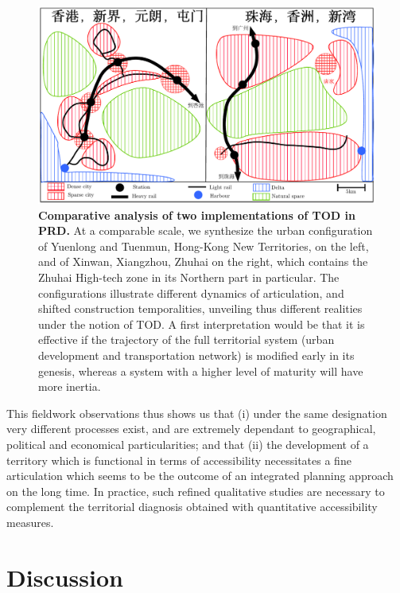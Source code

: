 \begin{figure}
	\includegraphics[width=\linewidth]{figures/tod.pdf}
	\caption{\textbf{Comparative analysis of two implementations of TOD in PRD.} At a comparable scale, we synthesize the urban configuration of Yuenlong and Tuenmun, Hong-Kong New Territories, on the left, and of Xinwan, Xiangzhou, Zhuhai on the right, which contains the Zhuhai High-tech zone in its Northern part in particular. The configurations illustrate different dynamics of articulation, and shifted construction temporalities, unveiling thus different realities under the notion of TOD. A first interpretation would be that it is effective if the trajectory of the full territorial system (urban development and transportation network) is modified early in its genesis, whereas a system with a higher level of maturity will have more inertia.\label{fig:qualitative:schema}}
\end{figure}



This fieldwork observations thus shows us that (i) under the same designation very different processes exist, and are extremely dependant to geographical, political and economical particularities; and that (ii) the development of a territory which is functional in terms of accessibility necessitates a fine articulation which seems to be the outcome of an integrated planning approach on the long time. In practice, such refined qualitative studies are necessary to complement the territorial diagnosis obtained with quantitative accessibility measures.



\section{Discussion}


